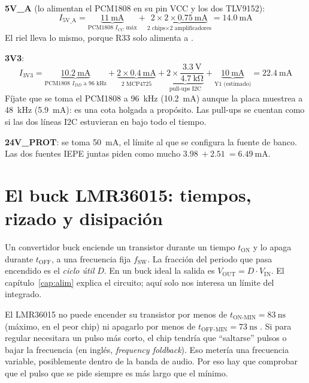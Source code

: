 \begin{calculo}
\textbf{5V\_A} (lo alimentan el PCM1808 en su pin VCC y los dos TLV9152):
\begin{equation}
I_\text{5V\_A} = \underbrace{\SI{11}{\milli\ampere}}_{\text{PCM1808 } I_{CC}\text{ máx}}
 + \underbrace{2 \times 2 \times \SI{0.75}{\milli\ampere}}_{\text{2 chips} \times \text{2 amplificadores}}
 = \SI{14.0}{\milli\ampere}
\end{equation}
El riel  lleva lo mismo, porque R33 solo alimenta a .

\textbf{3V3}:
\begin{equation}
I_\text{3V3} = \underbrace{\SI{10.2}{\milli\ampere}}_{\text{PCM1808 } I_{DD}\text{ a 96 kHz}}
 + \underbrace{2\times\SI{0.4}{\milli\ampere}}_{\text{2 MCP4725}}
 + \underbrace{2\times\frac{\SI{3.3}{\volt}}{\SI{4.7}{\kilo\ohm}}}_{\text{pull-ups I2C}}
 + \underbrace{\SI{10}{\milli\ampere}}_{\text{Y1 (estimado)}}
 = \SI{22.4}{\milli\ampere}
\end{equation}
Fíjate que se toma el PCM1808 a \SI{96}{\kilo\hertz} (\SI{10.2}{\milli\ampere}) aunque la placa muestrea a
\SI{48}{\kilo\hertz} (\SI{5.9}{\milli\ampere}): es una cota holgada a propósito. Las pull-ups se cuentan como si las
dos líneas I2C estuvieran en bajo todo el tiempo.

\textbf{24V\_PROT}: se toma \SI{50}{\milli\ampere}, el límite al que se configura la fuente de banco. Las dos fuentes
IEPE juntas piden como mucho $\SI{3.98}{} + \SI{2.51}{} = \SI{6.49}{\milli\ampere}$.
\end{calculo}

\section{El buck LMR36015: tiempos, rizado y disipación}\label{sec:c10-buck}

Un convertidor buck enciende un transistor durante un tiempo $t_\text{ON}$ y lo apaga durante $t_\text{OFF}$, a una
frecuencia fija $f_\text{SW}$. La fracción del periodo que pasa encendido es el \emph{ciclo útil} $D$. En un buck
ideal la salida es $V_\text{OUT} = D\cdot V_\text{IN}$. El capítulo~\ref{cap:alim} explica el circuito; aquí solo nos
interesa un límite del integrado.

\begin{idea}
El LMR36015 no puede encender su transistor por menos de $t_\text{ON-MIN} = \SI{83}{\nano\second}$ (máximo, en el
peor chip) ni apagarlo por menos de $t_\text{OFF-MIN} = \SI{73}{\nano\second}$ . Si para regular
necesitara un pulso más corto, el chip tendría que ``saltarse'' pulsos o bajar la frecuencia (en inglés,
\emph{frequency foldback}). Eso metería una frecuencia variable, posiblemente dentro de la banda de audio. Por eso hay
que comprobar que el pulso que se pide siempre es más largo que el mínimo.
\end{idea}

